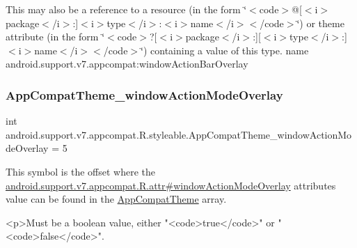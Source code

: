 This may also be a reference to a resource (in the form \char`\"{}$<$code$>$@\mbox{[}$<$i$>$package$<$/i$>$\+:\mbox{]}$<$i$>$type$<$/i$>$\+:$<$i$>$name$<$/i$>$$<$/code$>$\char`\"{}) or theme attribute (in the form \char`\"{}$<$code$>$?\mbox{[}$<$i$>$package$<$/i$>$\+:\mbox{]}\mbox{[}$<$i$>$type$<$/i$>$\+:\mbox{]}$<$i$>$name$<$/i$>$$<$/code$>$\char`\"{}) containing a value of this type.  name android.\+support.\+v7.\+appcompat\+:window\+Action\+Bar\+Overlay \mbox{\label{classandroid_1_1support_1_1v7_1_1appcompat_1_1R_1_1styleable_a68fc3502f128d8ccc5f6cb4fe4662317}} 
\subsubsection{\texorpdfstring{App\+Compat\+Theme\+\_\+window\+Action\+Mode\+Overlay}{AppCompatTheme\_windowActionModeOverlay}}
{\footnotesize\ttfamily int android.\+support.\+v7.\+appcompat.\+R.\+styleable.\+App\+Compat\+Theme\+\_\+window\+Action\+Mode\+Overlay = 5\hspace{0.3cm}{\ttfamily [static]}}

This symbol is the offset where the \hyperlink{classandroid_1_1support_1_1v7_1_1appcompat_1_1R_1_1attr_ac8444ac2d86dbdcb89e0cb5cb2a83541}{android.\+support.\+v7.\+appcompat.\+R.\+attr\#window\+Action\+Mode\+Overlay} attribute\textquotesingle{}s value can be found in the \hyperlink{classandroid_1_1support_1_1v7_1_1appcompat_1_1R_1_1styleable_a5c42f89e8a410c323be34208d75c430b}{App\+Compat\+Theme} array.

\begin{DoxyVerb}      <p>Must be a boolean value, either "<code>true</code>" or "<code>false</code>".
\end{DoxyVerb}
 


